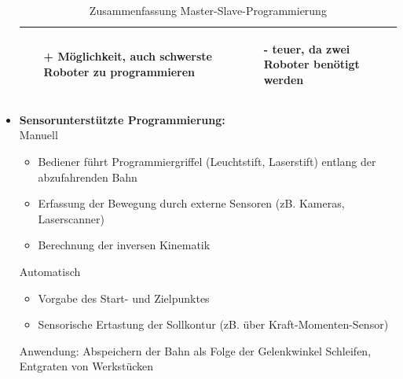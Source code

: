 \begin{itemize}
\begin{table}[hbt]
\begin{tabular}{|p{6.5cm}|p{6.5cm}|}
\begin{itemize}
\setlength\itemsep{0em}
\item[+] Möglichkeit, auch schwerste Roboter zu programmieren
\end{itemize}
 &
 \vspace{-5mm}
\begin{itemize}
\setlength\itemsep{0em}
\item[-] teuer, da zwei Roboter benötigt werden
\end{itemize}\\
\hline
\end{tabular}
\caption{Zusammenfassung Master-Slave-Programmierung}
\label{tab:MSprog}
\end{table}
\item \textbf{Sensorunterstützte Programmierung:}\\
Manuell
\begin{itemize}
\item Bediener führt Programmiergriffel (Leuchtstift, Laserstift) entlang der
abzufahrenden Bahn
\item Erfassung der Bewegung durch externe Sensoren (zB. Kameras,
Laserscanner)
\item Berechnung der inversen Kinematik
\end{itemize}
Automatisch
\begin{itemize}
\item Vorgabe des Start- und Zielpunktes
\item Sensorische Ertastung der Sollkontur (zB. über Kraft-Momenten-Sensor)
\end{itemize}
Anwendung: Abspeichern der Bahn als Folge der Gelenkwinkel
Schleifen, Entgraten von Werkstücken	
\end{itemize}

